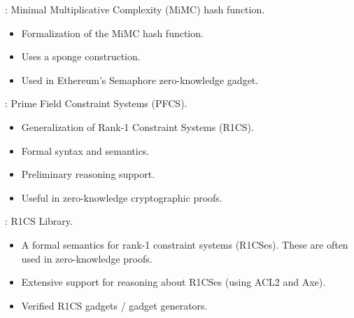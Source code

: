 
\begin{frame}

\newlibtitle

:
Minimal Multiplicative Complexity (MiMC) hash function.
\begin{itemize}
\item Formalization of the MiMC hash function.
\item Uses a sponge construction.
\item Used in Ethereum's Semaphore zero-knowledge gadget.
\end{itemize}

\end{frame}


\begin{frame}

\newlibtitle

:
Prime Field Constraint Systems (PFCS).
\begin{itemize}
\item Generalization of Rank-1 Constraint Systems (R1CS).
\item Formal syntax and semantics.
\item Preliminary reasoning support.
\item Useful in zero-knowledge cryptographic proofs.
\end{itemize}

\end{frame}


\begin{frame}

\newlibtitle

: R1CS Library.
\begin{itemize}
\item A formal semantics for rank-1 constraint systems (R1CSes). These
  are often used in zero-knowledge proofs.
\item Extensive support for reasoning about R1CSes (using ACL2 and Axe).
\item Verified R1CS gadgets / gadget generators.
\end{itemize}

\end{frame}

